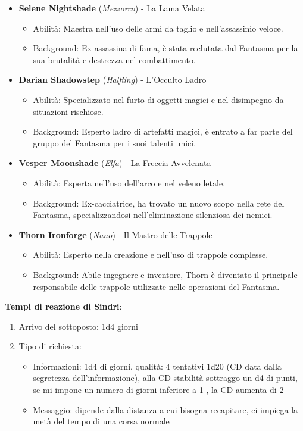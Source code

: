 \documentclass{article}
\begin{document}
\begin{itemize}
\item \textbf{Selene Nightshade} (\textit{Mezzorco}) - La Lama Velata
  \begin{itemize}
    \item Abilità: Maestra nell'uso delle armi da taglio e nell'assassinio veloce.
    \item Background: Ex-assassina di fama, è stata reclutata dal Fantasma per la sua brutalità e destrezza nel combattimento.
  \end{itemize}

\item \textbf{Darian Shadowstep} (\textit{Halfling}) - L'Occulto Ladro
  \begin{itemize}
    \item Abilità: Specializzato nel furto di oggetti magici e nel disimpegno da situazioni rischiose.
    \item Background: Esperto ladro di artefatti magici, è entrato a far parte del gruppo del Fantasma per i suoi talenti unici.
  \end{itemize}

\item \textbf{Vesper Moonshade} (\textit{Elfa}) - La Freccia Avvelenata
  \begin{itemize}
    \item Abilità: Esperta nell'uso dell'arco e nel veleno letale.
    \item Background: Ex-cacciatrice, ha trovato un nuovo scopo nella rete del Fantasma, specializzandosi nell'eliminazione silenziosa dei nemici.
  \end{itemize}

\item \textbf{Thorn Ironforge} (\textit{Nano}) - Il Mastro delle Trappole
  \begin{itemize}
    \item Abilità: Esperto nella creazione e nell'uso di trappole complesse.
    \item Background: Abile ingegnere e inventore, Thorn è diventato il principale responsabile delle trappole utilizzate nelle operazioni del Fantasma.
  \end{itemize}

\end{itemize}

\textbf{Tempi di reazione di Sindri}: 
\begin{enumerate}
    \item Arrivo del sottoposto: 1d4 giorni
    \item Tipo di richiesta: 
        \begin{itemize}
            \item Informazioni: 1d4 di giorni, qualità: 4 tentativi 1d20 (CD data dalla segretezza dell'informazione), alla CD stabilità sottraggo un d4 di punti, se mi impone un numero di giorni inferiore a 1 , la CD aumenta di 2 
            \item Messaggio: dipende dalla distanza a cui bisogna recapitare, ci impiega la metà del tempo di una corsa normale
        \end{itemize}
\end{enumerate}
\end{document}
